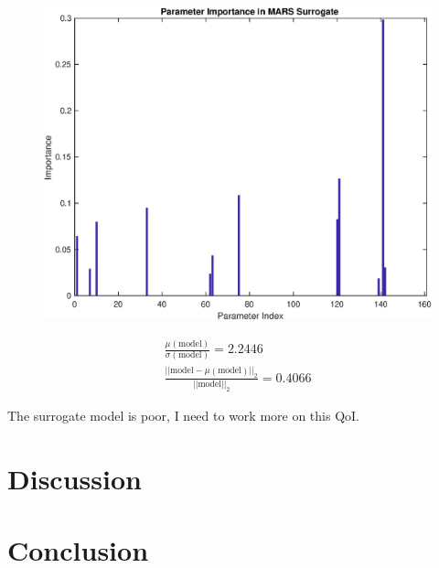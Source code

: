 \documentclass[12pt]{article}
\numberwithin{equation}{section}
\begin{document}
\begin{figure}[h]
\includegraphics[width=.49 \textwidth]{Figures/AMp_Time_to_Min_QoI_MARS_VI_Experimental.eps}
\end{figure}

\begin{eqnarray*}
\frac{\mu(\text{model})}{\sigma(\text{model})} = 2.2446\\
\frac{\vert \vert \text{model}-\mu(\text{model}) \vert \vert_2 }{\vert \vert \text{model}\vert \vert_2 } = 0.4066
\end{eqnarray*}

The surrogate model is poor, I need to work more on this QoI.

\section{Discussion}
\section{Conclusion}

\end{document}
